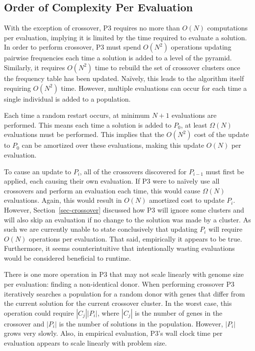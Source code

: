 \documentclass{sig-alternate}
\begin{document}
\subsection{Order of Complexity Per Evaluation}
With the exception of crossover, P3 requires no more than $O(N)$ computations
per evaluation, implying it is limited by the time required to evaluate a solution.
In order to perform crossover, P3 must spend $O(N^2)$ operations updating pairwise
frequencies each time a solution is added to a level of the pyramid.  Similarly,
it requires $O(N^2)$ time to rebuild the set of crossover clusters once the frequency
table has been updated.  Na\"ively, this leads to the algorithm itself requiring $O(N^2)$ time.
However, multiple evaluations can occur for each time a single individual is added
to a population.

Each time a random restart occurs, at minimum $N+1$ evaluations are performed.
This means each time a solution is added to $P_0$, at least $\Omega(N)$ evaluations
must be performed.  This implies that the $O(N^2)$ cost of the update to $P_0$ can
be amortized over these evaluations, making this update $O(N)$ per evaluation.

To cause an update to $P_i$, all of the crossovers discovered for
$P_{i-1}$ must first be applied, each causing their own evaluation.
If P3 were to na\"ively use all crossovers and perform an evaluation
each time, this would cause $\Omega(N)$ evaluations.  Again, this would
result in $O(N)$ amortized cost to update $P_i$.  However,
Section~\ref{sec-crossover} discussed how P3 will ignore some clusters
and will also skip an evaluation if no change to the solution was made
by a cluster.  As such we are currently unable to state conclusively
that updating $P_i$ will require $O(N)$ operations per evaluation.  That said,
empirically it appears to be true.  Furthermore, it seems counterintuitive
that intentionally wasting evaluations would be considered beneficial
to runtime.

There is one more operation in P3 that may not scale linearly with
genome size per evaluation: finding a non-identical donor.  When
performing crossover P3 iteratively searches a population for a random
donor with genes that differ from the current solution for
the current crossover cluster.  In the worst case, this operation
could require $|C_j||P_i|$, where $|C_j|$ is the number of genes in
the crossover and $|P_i|$ is the number of solutions in the
population.  However, $|P_i|$ grows very slowly.  Also, in empirical
evaluation, P3's wall clock time per evaluation appears to scale
linearly with problem size.
\end{document}
